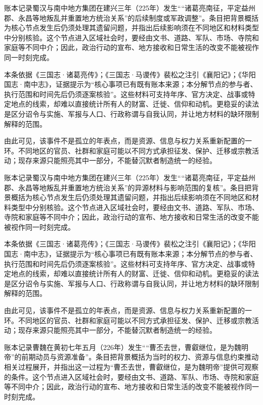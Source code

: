 账本记录蜀汉与南中地方集团在建兴三年（225年）发生““诸葛亮南征，平定益州郡、永昌等地叛乱并重置地方统治关系”的后续制度或军政调整”。条目把背景概括为核心节点发生后仍须处理其遗留问题，并指出后续影响须在不同地区和材料类型中分别核验。这个节点进入区域社会时，要经由文书、道路、军队、市场、寺院和家庭等不同中介；因此，政治行动的宣布、地方接收和日常生活的改变不能被视作同一时刻完成。

本条依据《三国志·诸葛亮传》；《三国志·马谡传》裴松之注引《襄阳记》；《华阳国志·南中志》，证据提示为“核心事项已有既有账本来源；本分解节点的参与者、执行范围和时间先后仍须逐案核验”。这些材料可支持年序、官方决定、战事或特定地点的线索，却难以直接统计所有人的财富、迁徙、信仰和动机。更稳妥的读法是区分诏令与实施、军报与人口、行政称谓与自我认同，并让地方材料的缺环限制解释的范围。

由此可见，该事件不是孤立的年表点，而是资源、信息与权力关系重新配置的一环。不同地区的官员、社群和家庭可能以不同方式承担征发、保护、迁移或宗教活动；现存来源只能照亮其中一部分，不能替沉默者制造统一的经验。

账本记录蜀汉与南中地方集团在建兴三年（225年）发生““诸葛亮南征，平定益州郡、永昌等地叛乱并重置地方统治关系”的异源材料与影响范围的复核”。条目把背景概括为核心节点发生后仍须处理其遗留问题，并指出后续影响须在不同地区和材料类型中分别核验。这个节点进入区域社会时，要经由文书、道路、军队、市场、寺院和家庭等不同中介；因此，政治行动的宣布、地方接收和日常生活的改变不能被视作同一时刻完成。

本条依据《三国志·诸葛亮传》；《三国志·马谡传》裴松之注引《襄阳记》；《华阳国志·南中志》，证据提示为“核心事项已有既有账本来源；本分解节点的参与者、执行范围和时间先后仍须逐案核验”。这些材料可支持年序、官方决定、战事或特定地点的线索，却难以直接统计所有人的财富、迁徙、信仰和动机。更稳妥的读法是区分诏令与实施、军报与人口、行政称谓与自我认同，并让地方材料的缺环限制解释的范围。

由此可见，该事件不是孤立的年表点，而是资源、信息与权力关系重新配置的一环。不同地区的官员、社群和家庭可能以不同方式承担征发、保护、迁移或宗教活动；现存来源只能照亮其中一部分，不能替沉默者制造统一的经验。

账本记录曹魏在黄初七年五月（226年）发生““曹丕去世，曹叡继位，是为魏明帝”的前期动员与资源准备”。条目把背景概括为当时的权力、资源与信息约束推动相关过程展开，并指出这一过程为“曹丕去世，曹叡继位，是为魏明帝”提供可观察的条件。这个节点进入区域社会时，要经由文书、道路、军队、市场、寺院和家庭等不同中介；因此，政治行动的宣布、地方接收和日常生活的改变不能被视作同一时刻完成。

